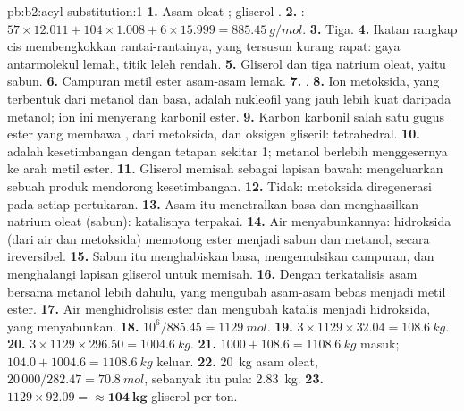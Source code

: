 \begin{solution}{pb:b2:acyl-substitution:1}
\textbf{1.} Asam oleat ; gliserol .
\textbf{2.} : $57 \times 12.011 + 104 \times 1.008 + 6 \times 15.999 = \qty{885.45}{g/mol}$.
\textbf{3.} Tiga.
\textbf{4.} Ikatan rangkap cis membengkokkan rantai-rantainya, yang tersusun
kurang rapat: gaya antarmolekul lemah, titik leleh rendah.
\textbf{5.} Gliserol dan tiga natrium oleat, yaitu sabun.
\textbf{6.} Campuran metil ester asam-asam lemak.
\textbf{7.} .
\textbf{8.} Ion metoksida, yang terbentuk dari metanol dan basa, adalah
nukleofil yang jauh lebih kuat daripada metanol; ion ini menyerang karbonil
ester.
\textbf{9.} Karbon karbonil salah satu gugus ester yang membawa ,
 dari metoksida, dan oksigen gliseril: tetrahedral.
\textbf{10.}  adalah kesetimbangan dengan tetapan sekitar 1;
metanol berlebih menggesernya ke arah metil ester.
\textbf{11.} Gliserol memisah sebagai lapisan bawah: mengeluarkan sebuah
produk mendorong kesetimbangan.
\textbf{12.} Tidak: metoksida diregenerasi pada setiap pertukaran.
\textbf{13.} Asam itu menetralkan basa dan menghasilkan natrium oleat
(sabun): katalisnya terpakai.
\textbf{14.} Air menyabunkannya: hidroksida (dari air dan metoksida)
memotong ester menjadi sabun dan metanol, secara ireversibel.
\textbf{15.} Sabun itu menghabiskan basa, mengemulsikan campuran, dan
menghalangi lapisan gliserol untuk memisah.
\textbf{16.} Dengan  terkatalisis asam bersama metanol lebih
dahulu, yang mengubah asam-asam bebas menjadi metil ester.
\textbf{17.} Air menghidrolisis ester dan mengubah katalis menjadi
hidroksida, yang menyabunkan.
\textbf{18.} $10^6/885.45 = \qty{1129}{mol}$.
\textbf{19.} $3 \times 1129 \times 32.04 = \qty{108.6}{kg}$.
\textbf{20.} $3 \times 1129 \times 296.50 = \qty{1004.6}{kg}$.
\textbf{21.} $1000 + 108.6 = \qty{1108.6}{kg}$ masuk; $104.0 + 1004.6 = \qty{1108.6}{kg}$ keluar.
\textbf{22.} \qty{20}{kg} asam oleat, $20\,000/282.47 = \qty{70.8}{mol}$,  sebanyak itu pula:
\qty{2.83}{kg}.
\textbf{23.} $1129 \times 92.09 = \boldsymbol{\approx \qty{104}{kg}}$ gliserol per ton.
\end{solution}
